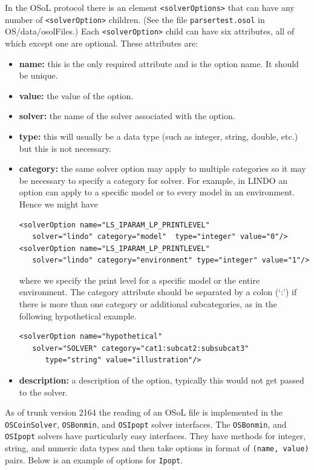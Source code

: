 \documentclass[11pt]{article}
\renewcommand{\_}{{\char"5F}}
\renewcommand{\{}{{\char"7B}}
\renewcommand{\}}{{\char"7D}}
\renewcommand{\^}{{\char"0D}}
\renewcommand{\'}{{\char"0D}}
\begin{document}
\begin{enumerate}[Step 1:]
In the OSoL protocol there is an element {\tt <solverOptions>} that can have any number of {\tt <solverOption>} 
children. (See the file {\tt parsertest.osol} in OS/data/osolFiles.)  Each {\tt <solverOption>} child can have 
six attributes, all of which except one are optional. These attributes are:

\begin{itemize}

\item {\bf name:} this is the only required attribute and is the option name. It should be unique.

\item {\bf value:}  the value of the option.

\item {\bf solver:} the name of the solver associated with the option.

\item {\bf type:} this will usually be a data type (such as integer, string, double, etc.) but this is not necessary.

\item {\bf category:} the same solver option may apply to multiple categories so it may be necessary to specify a 
category for solver. For example, in LINDO an option can apply to a specific model or to every model in an environment. 
Hence we might have

\begin{verbatim}
<solverOption name="LS_IPARAM_LP_PRINTLEVEL" 
   solver="lindo" category="model"  type="integer" value="0"/>
<solverOption name="LS_IPARAM_LP_PRINTLEVEL" 
   solver="lindo" category="environment" type="integer" value="1"/>
\end{verbatim}
where we specify the print level for a specific model or the entire environment.   The category attribute should be 
separated by a colon (`:') if there is more than one  category or  additional subcategories, 
as in the following hypothetical example.
\begin{verbatim}
<solverOption name="hypothetical" 
   solver="SOLVER" category="cat1:subcat2:subsubcat3" 
      type="string" value="illustration"/>
\end{verbatim}

\item {\bf description:} a description of the option, typically this would not get passed to the solver.

\end{itemize}

As of trunk version 2164 the reading of an OSoL file is implemented in the {\tt OSCoinSolver}, 
{\tt OSBonmin}, and {\tt OSIpopt} solver interfaces.   The  {\tt OSBonmin}, and {\tt OSIpopt} solvers have 
particularly easy interfaces. 
They have methods for integer, string, and numeric data types and then take options in format of {\tt (name, value)} pairs.
Below is an example of options for {\tt Ipopt}.



\end{enumerate}
\end{document}
